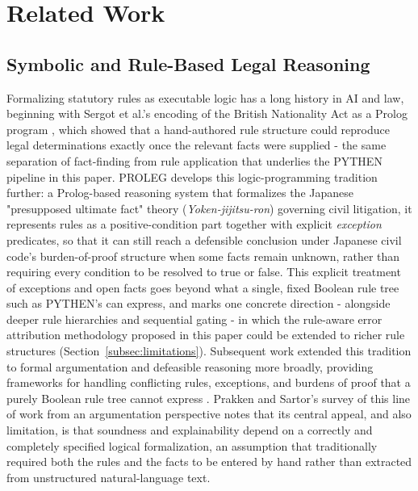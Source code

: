 \section{Related Work}
\label{sec:related}

\subsection{Symbolic and Rule-Based Legal Reasoning}
\label{subsec:related-symbolic}
Formalizing statutory rules as executable logic has a long history in AI and law, beginning with Sergot et al.'s encoding of the British Nationality Act as a Prolog program \cite{sergot1986}, which showed that a hand-authored rule structure could reproduce legal determinations exactly once the relevant facts were supplied - the same separation of fact-finding from rule application that underlies the PYTHEN pipeline in this paper. PROLEG \cite{satoh2010proleg} develops this logic-programming tradition further: a Prolog-based reasoning system that formalizes the Japanese "presupposed ultimate fact" theory (\textit{Yoken-jijitsu-ron}) governing civil litigation, it represents rules as a positive-condition part together with explicit \textit{exception} predicates, so that it can still reach a defensible conclusion under Japanese civil code's burden-of-proof structure when some facts remain unknown, rather than requiring every condition to be resolved to true or false. This explicit treatment of exceptions and open facts goes beyond what a single, fixed Boolean rule tree such as PYTHEN's can express, and marks one concrete direction - alongside deeper rule hierarchies and sequential gating - in which the rule-aware error attribution methodology proposed in this paper could be extended to richer rule structures (Section~\ref{subsec:limitations}). Subsequent work extended this tradition to formal argumentation and defeasible reasoning more broadly, providing frameworks for handling conflicting rules, exceptions, and burdens of proof that a purely Boolean rule tree cannot express \cite{benchcapon2007}. Prakken and Sartor's survey of this line of work from an argumentation perspective \cite{prakken2020} notes that its central appeal, and also limitation, is that soundness and explainability depend on a correctly and completely specified logical formalization, an assumption that traditionally required both the rules and the facts to be entered by hand rather than extracted from unstructured natural-language text.

